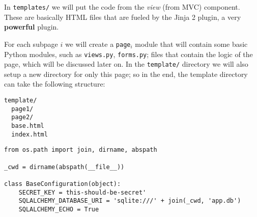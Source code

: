 \documentclass[../main/main.tex]{subfiles}
\begin{document}
In \lstinline|templates/| we will put the code from the \textit{view}
(from MVC) component. These are basically HTML files that are fueled
by the Jinja 2 plugin, a very \textbf{powerful} plugin. 

For each subpage $i$ we will create a \lstinline|page|$_i$ module that
will contain some basic Python modules, such as \lstinline|views.py|,
\lstinline|forms.py|; files that contain the logic of the page, which
will be discussed later on. In the \lstinline|template/| directory we
will also setup a new directory for only this page; so in the end, the
template directory can take the following structure: 

\begin{lstlisting}
template/
  page1/
  page2/
  base.html
  index.html
\end{lstlisting}

\begin{lstlisting}
from os.path import join, dirname, abspath

_cwd = dirname(abspath(__file__))

class BaseConfiguration(object):
    SECRET_KEY = this-should-be-secret'
    SQLALCHEMY_DATABASE_URI = 'sqlite:///' + join(_cwd, 'app.db')
    SQLALCHEMY_ECHO = True
\end{lstlisting}
\end{document}
